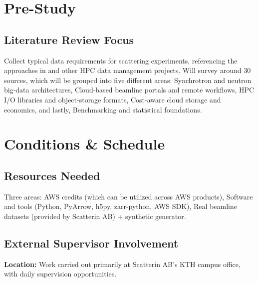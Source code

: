 \documentclass{article}
\begin{document}
\section{Pre-Study}

\subsection{Literature Review Focus}
Collect typical data requirements for scattering experiments, referencing the approaches in \cite{wang2018synchrotron, meyer2014store, moriyama2019public, kek2021aws, godoy2021efficient} and other HPC data management projects. Will survey around 30 sources, which will be grouped into five different areas: Synchrotron and neutron big‐data architectures, Cloud‐based beamline portals and remote workflows, HPC I/O libraries and object-storage formats, Cost-aware cloud storage and economics, and lastly, Benchmarking and statistical foundations.




\section{Conditions \& Schedule}

\subsection{Resources Needed}
Three areas: AWS credits (which can be utilized across AWS products), Software and tools (Python, PyArrow, h5py, zarr-python, AWS SDK), Real beamline datasets (provided by Scatterin AB) + synthetic generator.

\subsection{External Supervisor Involvement}
\textbf{Location:} Work carried out primarily at Scatterin AB’s KTH campus office, with daily supervision opportunities.
\end{document}
